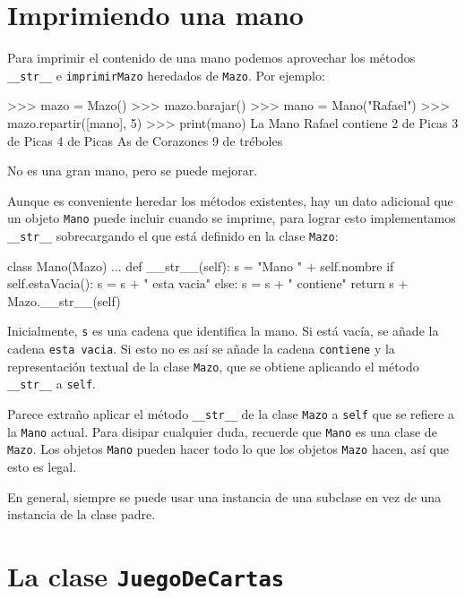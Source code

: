 \section{Imprimiendo una mano}


Para imprimir el contenido de una mano podemos aprovechar los métodos
\texttt{\_\_str\_\_} e \texttt{imprimirMazo} heredados de \texttt{Mazo}.
Por ejemplo:

\begin{pyconcode}
>>> mazo = Mazo()
>>> mazo.barajar()
>>> mano = Mano("Rafael")
>>> mazo.repartir([mano], 5)
>>> print(mano)
La Mano Rafael contiene
2 de Picas
 3 de Picas
  4 de Picas
   As de Corazones
    9 de tréboles
\end{pyconcode}
 No es una gran mano, pero se puede mejorar.

Aunque es conveniente heredar los métodos existentes, hay un dato
adicional que un objeto \texttt{Mano} puede incluir cuando se imprime,
para lograr esto implementamos \texttt{\_\_str\_\_} sobrecargando
el que está definido en la clase \texttt{Mazo}:

\begin{pythoncode}
class Mano(Mazo)
  ...
  def __str__(self):
    s = "Mano " + self.nombre
    if self.estaVacia():
      s = s + " esta vacia\n"
    else:
      s = s + " contiene\n"
    return s + Mazo.__str__(self)
\end{pythoncode}
 Inicialmente, \texttt{s} es una cadena que identifica la mano. Si
está vacía, se añade la cadena \texttt{esta vacia}. Si esto no es
así se añade la cadena \texttt{contiene} y la representación textual
de la clase \texttt{Mazo}, que se obtiene aplicando el método \texttt{\_\_str\_\_}
a \texttt{self}.

Parece extraño aplicar el método \texttt{\_\_str\_\_} de la clase
\texttt{Mazo} a \texttt{self} que se refiere a la \texttt{Mano} actual.
Para disipar cualquier duda, recuerde que \texttt{Mano} es una clase
de \texttt{Mazo}. Los objetos \texttt{Mano} pueden hacer todo lo que
los objetos \texttt{Mazo} hacen, así que esto es legal.

  

En general, siempre se puede usar una instancia de una subclase en
vez de una instancia de la clase padre.

\section{La clase \texttt{JuegoDeCartas}}

